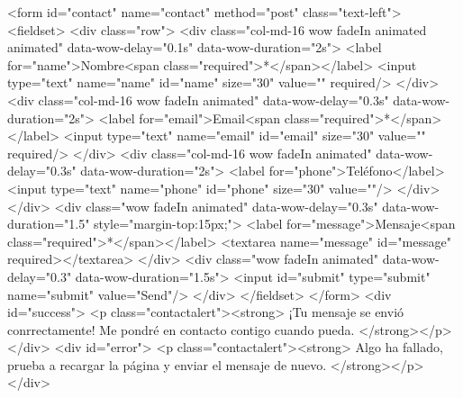 <form id="contact" name="contact" method="post" class="text-left">
  <fieldset>
    <div class="row">
      <div class="col-md-16 wow fadeIn animated animated" data-wow-delay="0.1s" data-wow-duration="2s">
        <label for="name">Nombre<span class="required">*</span></label>
        <input type="text" name="name" id="name" size="30" value="" required/>
      </div>
      <div class="col-md-16 wow fadeIn animated" data-wow-delay="0.3s" data-wow-duration="2s">
        <label for="email">Email<span class="required">*</span></label>
        <input type="text" name="email" id="email" size="30" value="" required/>
      </div>
      <div class="col-md-16 wow fadeIn animated" data-wow-delay="0.3s" data-wow-duration="2s">
        <label for="phone">Teléfono</label>
        <input type="text" name="phone" id="phone" size="30" value=""/>
      </div>
    </div>
    <div class="wow fadeIn animated" data-wow-delay="0.3s" data-wow-duration="1.5" style="margin-top:15px;">
      <label for="message">Mensaje<span class="required">*</span></label>
      <textarea name="message" id="message" required></textarea>
    </div>
    <div class="wow fadeIn animated" data-wow-delay="0.3" data-wow-duration="1.5s">
      <input id="submit" type="submit" name="submit" value="Send"/>
    </div>
  </fieldset>
</form>
<div id="success">
  <p class="contactalert"><strong>
    ¡Tu mensaje se envió conrrectamente! Me pondré en contacto contigo cuando pueda.
  </strong></p>
</div>
<div id="error">
  <p class="contactalert"><strong>
     Algo ha fallado, prueba a recargar la página y enviar el mensaje de nuevo.
  </strong></p>
</div>

